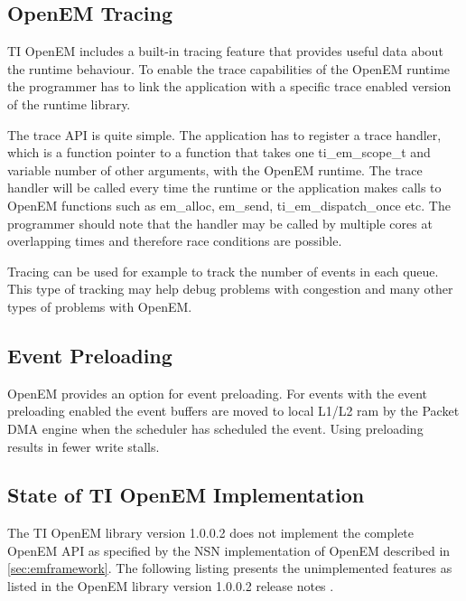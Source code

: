 \subsection{OpenEM Tracing}
TI OpenEM includes a built-in tracing feature that provides useful data about
the runtime behaviour. To enable the trace capabilities of the OpenEM runtime the
programmer has to link the application with a specific trace enabled version of
the runtime library. \cite{openemapi}

The trace API is quite simple. The application has to register a trace handler,
which is a function pointer to a function that takes one ti\_em\_scope\_t and
variable number of other arguments, with the OpenEM runtime. The trace handler
will be called every time the runtime or the application makes calls to OpenEM
functions such as em\_alloc, em\_send, ti\_em\_dispatch\_once etc.
\cite{openemapi} The programmer should note that the handler may be called by
multiple cores at overlapping times and therefore race conditions are possible.

Tracing can be used for example to track the number of events in each queue.
This type of tracking may help debug problems with congestion and many other
types of problems with OpenEM.

\subsection{Event Preloading}
OpenEM provides an option for event preloading. For events with the event
preloading enabled the event buffers are moved to local L1/L2 ram by the Packet
DMA engine when the scheduler has scheduled the event. Using preloading results
in fewer write stalls. \cite{openemwhite}

\subsection{State of TI OpenEM Implementation}
The TI OpenEM library version 1.0.0.2 does not implement the complete OpenEM API
as specified by the NSN implementation of OpenEM described in
\ref{sec:emframework}. The following listing presents the unimplemented features
as listed in the OpenEM library version 1.0.0.2 release notes
\cite{openemnotes}.

